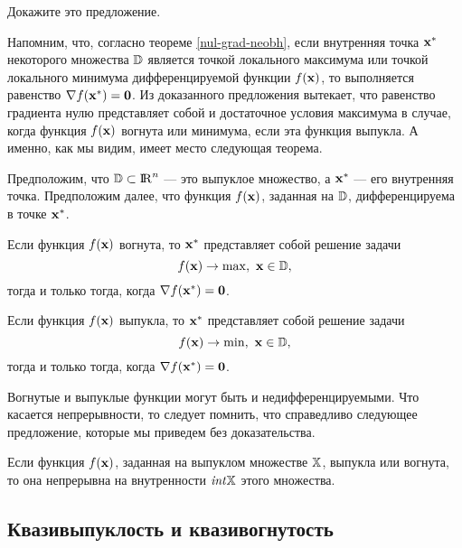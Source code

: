 \begin{exer}
    Докажите это предложение.
\end{exer}









    Напомним, что, согласно теореме \ref{nul-grad-neobh}, если внутренняя точка
    $\mathbf{x^{*}}$ некоторого множества $\mathbb{D}$ является точкой локального
    максимума или точкой локального минимума дифференцируемой функции $f(\mathbf{x})$,
    то выполняется равенство $\nabla f(\mathbf{x^{*}})=\mathbf{0}$. Из
    доказанного предложения вытекает, что равенство градиента нулю
    представляет собой и достаточное условия максимума в случае,
    когда функция $f(\mathbf{x})$ вогнута или минимума, если эта функция
    выпукла. А именно, как мы видим, имеет место следующая теорема.

\begin{teo}\label{grad-nul}
    Предположим, что $\mathbb{D}\subset{\rm I\!R}^{n}$ --- это выпуклое
    множество, а $\mathbf{x^{*}}$ --- его внутренняя точка. Предположим
    далее, что функция $f(\mathbf{x})$, заданная на $\mathbb{D}$, дифференцируема в
    точке $\mathbf{x^{*}}$.

    Если функция $f(\mathbf{x})$ вогнута, то
    $\mathbf{x^{*}}$ представляет собой решение задачи
\[
    f(\vc{x})\rightarrow\max, \ \vc{x}\in\st{D},
\]
    тогда и только тогда, когда $\nabla f(\mathbf{x^{*}})=\mathbf{0}$.

    Если функция $f(\mathbf{x})$ выпукла, то
    $\mathbf{x^{*}}$ представляет собой решение задачи
\[
    f(\vc{x})\rightarrow\min, \ \vc{x}\in\st{D},
\]
    тогда и только тогда, когда $\nabla f(\mathbf{x^{*}})=\mathbf{0}$.
\end{teo}


    Вогнутые и выпуклые функции могут быть и недифференцируемыми. Что касается непрерывности,
    то следует помнить, что справедливо следующее предложение, которые мы приведем без
    доказательства.

\begin{prop}
    Если функция $f(\mathbf{x})$, заданная на выпуклом множестве $\mathbb{X}$, выпукла или вогнута,
    то она непрерывна на внутренности $\text{\emph{int}}\mathbb{X}$ этого множества.
\end{prop}

\subsection{Квазивыпуклость и квазивогнутость}

